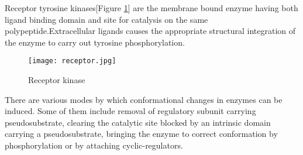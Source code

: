 \documentclass[12pt]{article}
\begin{document}
Receptor tyrosine kinases[Figure \ref{fig receptor}] are the membrane bound enzyme having both ligand binding domain and site for catalysis on the same polypeptide.Extracellular ligands causes the appropriate structural integration of the enzyme to carry out tyrosine phosphorylation.
\begin{figure}[h]
\centering
\texttt{[image: receptor.jpg]}
\caption{Receptor kinase}
\label{fig receptor}
\end{figure}
There are various modes by which conformational changes in enzymes can be induced. Some of them include removal of regulatory subunit carrying pseudosubstrate, clearing the catalytic site blocked by an intrinsic domain carrying a pseudosubstrate, bringing the enzyme to correct conformation by phosphorylation or by attaching cyclic-regulators.
\end{document}
